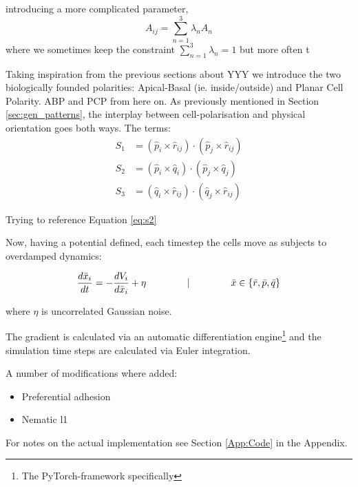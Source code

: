  introducing a more complicated parameter, 
\begin{equation}
    A_{ij}=\sum_{n=1}^{3}\lambda_n A_n
\end{equation}
where we sometimes keep the constraint $\sum_{n=1}^{3}\lambda_n=1$ but more often t


Taking inspiration from the previous sections about YYY we introduce the two biologically founded polarities: Apical-Basal (ie. inside/outside) and Planar Cell Polarity. ABP and PCP from here on. As previously mentioned in Section \ref{sec:gen_patterns}, the interplay between cell-polarisation and physical orientation goes both ways. The terms:
\begin{subequations}
\begin{align}
S_1&=\left(\hat{p}_i \times \hat{r}_{i j}\right) \cdot\left(\hat{p}_j \times \hat{r}_{i j}\right)\label{eq:s1}\\
S_2&=\left(\hat{p}_i \times \hat{q}_{i}\right) \cdot\left(\hat{p}_j \times \hat{q}_{j}\right)\label{eq:s2}\\
S_3&=\left(\hat{q}_i \times \hat{r}_{i j}\right) \cdot\left(\hat{q}_j \times \hat{r}_{i j}\right)\label{eq:s3}
\end{align}
\end{subequations}



Trying to reference Equation \ref{eq:s2}

Now, having a potential defined, each timestep the cells move as subjects to overdamped dynamics:

\begin{equation}
    \frac{d \bar{x}_i}{d t}=-\frac{d V_i}{d \bar{x}_i}+\eta \hspace{1.5cm}|\hspace{1.5cm}  \bar{x} \in \{\bar{r}, \bar{p}, \bar{q}\}
\end{equation}

where $\eta$ is uncorrelated Gaussian noise.

The gradient is calculated via an automatic differentiation engine\footnote{The PyTorch-framework specifically} and the simulation time steps are calculated via Euler integration.


A number of modifications where added:
\begin{itemize}
    \item Preferential adhesion
    \item Nematic l1
    
\end{itemize}


For notes on the actual implementation see Section \ref{App:Code} in the Appendix.